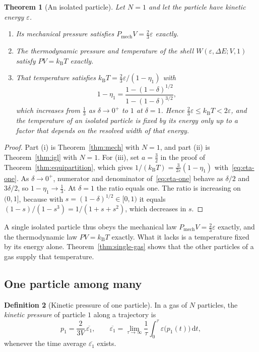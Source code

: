 \documentclass[11pt,a4paper]{article}
\newtheorem{theorem}{Theorem}[section]
\theoremstyle{definition}
\newtheorem{definition}[theorem]{Definition}
\theoremstyle{remark}
\newcommand{\kB}{k_{\mathrm{B}}}
\newcommand{\dd}{\mathrm{d}}
\newcommand{\Pmech}{P_{\mathrm{mech}}}
\begin{document}
\begin{theorem}[An isolated particle]
\label{thm:single-isolated}
Let $N=1$ and let the particle have kinetic energy $\varepsilon$.
\begin{enumerate}[label=(\roman*),leftmargin=2.2em]
\item Its mechanical pressure satisfies $\Pmech V=\tfrac23\varepsilon$ exactly.
\item The thermodynamic pressure and temperature of the shell $W(\varepsilon,\Delta E;V,1)$ satisfy $PV=\kB T$ exactly.
\item That temperature satisfies $\kB T=\tfrac23\varepsilon/(1-\eta_1)$ with
\begin{equation}
1-\eta_1=\frac{1-(1-\delta)^{1/2}}{1-(1-\delta)^{3/2}},
\label{eq:eta-one}
\end{equation}
which increases from $\tfrac13$ as $\delta\to0^{+}$ to $1$ at $\delta=1$.
Hence $\tfrac23\varepsilon\le\kB T<2\varepsilon$, and the temperature of an isolated particle is fixed by its energy only up to a factor that depends on the resolved width of that energy.
\end{enumerate}
\end{theorem}

\begin{proof}
Part (i) is Theorem~\ref{thm:mech} with $N=1$, and part (ii) is Theorem~\ref{thm:igl} with $N=1$.
For (iii), set $a=\tfrac32$ in the proof of Theorem~\ref{thm:equipartition}, which gives $1/(\kB T)=\tfrac{3}{2\varepsilon}(1-\eta_1)$ with~\eqref{eq:eta-one}.
As $\delta\to0^{+}$, numerator and denominator of~\eqref{eq:eta-one} behave as $\delta/2$ and $3\delta/2$, so $1-\eta_1\to\tfrac13$.
At $\delta=1$ the ratio equals one.
The ratio is increasing on $(0,1]$, because with $s=(1-\delta)^{1/2}\in[0,1)$ it equals $(1-s)/(1-s^{3})=1/(1+s+s^{2})$, which decreases in $s$.
\end{proof}

A single isolated particle thus obeys the mechanical law $\Pmech V=\tfrac23\varepsilon$ exactly, and the thermodynamic law $PV=\kB T$ exactly.
What it lacks is a temperature fixed by its energy alone.
Theorem~\ref{thm:single-gas} shows that the other particles of a gas supply that temperature.

\subsection{One particle among many}

\begin{definition}[Kinetic pressure of one particle]
\label{def:p1}
In a gas of $N$ particles, the \emph{kinetic pressure} of particle $1$ along a trajectory is
\begin{equation}
p_1=\frac{2}{3V}\,\overline{\varepsilon_1},\qquad
\overline{\varepsilon_1}=\lim_{\tau\to\infty}\frac1\tau\int_0^{\tau}\varepsilon\bigl(p_1(t)\bigr)\,\dd t,
\label{eq:p1}
\end{equation}
whenever the time average $\overline{\varepsilon_1}$ exists.
\end{definition}
\end{document}
